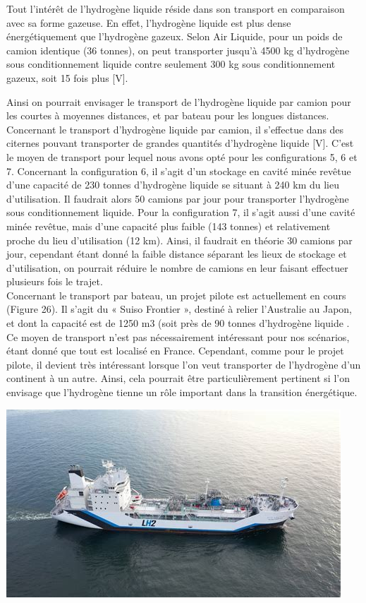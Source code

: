 \documentclass[11pt,french,a4paper]{article}
\begin{document}
\begin{multicols}{2}

Tout l’intérêt de l’hydrogène liquide réside dans son transport en comparaison avec sa forme gazeuse. En effet, l’hydrogène liquide est plus dense énergétiquement que l’hydrogène gazeux. Selon Air Liquide, pour un poids de camion identique (36 tonnes), on peut transporter jusqu’à 4500 kg d’hydrogène sous conditionnement liquide contre seulement 300 kg sous conditionnement gazeux, soit 15 fois plus [V].

Ainsi on pourrait envisager le transport de l’hydrogène liquide par camion pour les courtes à moyennes distances, et par bateau pour les longues distances. Concernant le transport d’hydrogène liquide par camion, il s’effectue dans des citernes pouvant transporter de grandes quantités d’hydrogène liquide [V]. C’est le moyen de transport pour lequel nous avons opté pour les configurations 5, 6 et 7. Concernant la configuration 6, il s’agit d’un stockage en cavité minée revêtue d’une capacité de 230 tonnes d’hydrogène liquide se situant à 240 km du lieu d’utilisation. Il faudrait alors 50 camions par jour pour transporter l’hydrogène sous conditionnement liquide. Pour la configuration 7, il s’agit aussi d’une cavité minée revêtue, mais d’une capacité plus faible (143 tonnes) et relativement proche du lieu d’utilisation (12 km). Ainsi, il faudrait en théorie 30 camions par jour, cependant étant donné la faible distance séparant les lieux de stockage et d’utilisation, on pourrait réduire le nombre de camions en leur faisant effectuer plusieurs fois le trajet.\\

Concernant le transport par bateau, un projet pilote est actuellement en cours (Figure 26). Il s’agit du « Suiso Frontier », destiné à relier l’Australie au Japon, et dont la capacité est de 1250 m3 (soit près de 90 tonnes d’hydrogène liquide \cite{The_Suiso_Frontier}. Ce moyen de transport n’est pas nécessairement intéressant pour nos scénarios, étant donné que tout est localisé en France. Cependant, comme pour le projet pilote, il devient très intéressant lorsque l’on veut transporter de l’hydrogène d’un continent à un autre. Ainsi, cela pourrait être particulièrement pertinent si l’on envisage que l’hydrogène tienne un rôle important dans la transition énergétique.

\begin{center}
\includegraphics[width=.9\linewidth]{image/chap3/Figure 3.ii-3.jpg}
\end{center}


\end{multicols}
\end{document}
